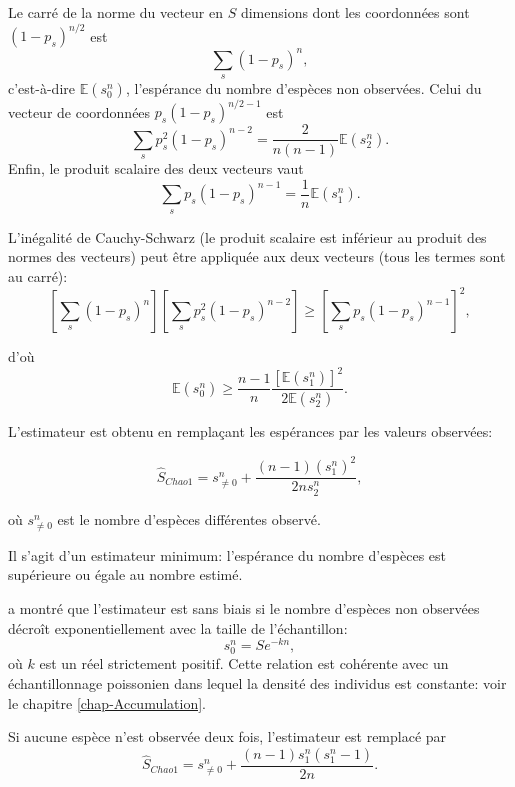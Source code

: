 \documentclass[
  11pt,
  french,
  a4paper,
  extrafontsizes,onecolumn,openright
  ]{memoir}
\begin{document}
Le carré de la norme du vecteur en \(S\) dimensions dont les coordonnées sont \((1-p_s)^{n/2}\) est
\[\sum_s{(1-p_s)^n},\]
c'est-à-dire \({\mathbb E}(s^{n}_{0})\), l'espérance du nombre d'espèces non observées.
Celui du vecteur de coordonnées \(p_s (1-p_s)^{n/2-1}\) est
\[\sum_s{p_s^2(1-p_s)^{n-2}}=\frac{2}{n(n-1)}{\mathbb E}(s^{n}_{2}).\]
Enfin, le produit scalaire des deux vecteurs vaut
\[\sum_s{p_s(1-p_s)^{n-1}}=\frac{1}{n}{\mathbb E}(s^{n}_{1}).\]

L'inégalité de Cauchy-Schwarz (le produit scalaire est inférieur au produit des normes des vecteurs) peut être appliquée aux deux vecteurs (tous les termes sont au carré):
\begin{equation}
  \label{eq:CauchySchwarz}
  \left[ \sum_s{(1-p_s)^n} \right] \left[ \sum_s{p_s^2(1-p_s)^{n-2}} \right] 
   \ge \left[ \sum_s{p_s(1-p_s)^{n-1}} \right]^2,
\end{equation}

d'où
\begin{equation}
  \label{eq:Esn0}
  {\mathbb E}(s^{n}_{0}) 
  \ge \frac{n-1}{n}\frac{\left[ {\mathbb E}(s^{n}_{1}) \right]^2}{2 {\mathbb E}(s^{n}_{2})}.
\end{equation}

L'estimateur est obtenu en remplaçant les espérances par les valeurs observées:

\begin{equation}
  \label{eq:Chao1}
  {\hat{S}}_\mathit{Chao1} 
   = s^{n}_{\ne 0} + \frac{\left(n-1 \right){\left(s^{n}_{1}\right)}^2}{2n{s^{n}_{2}}},
\end{equation}

où \(s^{n}_{\ne 0}\) est le nombre d'espèces différentes observé.

Il s'agit d'un estimateur minimum: l'espérance du nombre d'espèces est supérieure ou égale au nombre estimé.

\textcite{Beguinot2014} a montré que l'estimateur est sans biais si le nombre d'espèces non observées décroît exponentiellement avec la taille de l'échantillon:
\begin{equation}
  \label{eq:BiaisChao}
  s^{n}_{0} = S e^{-kn},
\end{equation}
où \(k\) est un réel strictement positif.
Cette relation est cohérente avec un échantillonnage poissonien dans lequel la densité des individus est constante: voir le chapitre \ref{chap-Accumulation}.

Si aucune espèce n'est observée deux fois, l'estimateur est remplacé par
\begin{equation}
  \label{eq:Chao1sansf2}
  {\hat{S}}_\mathit{Chao1} = s^{n}_{\ne 0} + \frac{\left(n-1\right){s^{n}_{1}}\left(s^{n}_{1}-1\right)}{2n}.
\end{equation}
\end{document}
